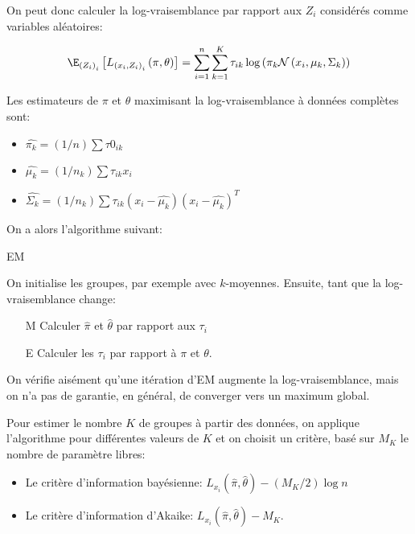 \documentclass[info, math, french]{mpb-cours}
\def\that{\hat{\theta}}
\begin{document}
On peut donc calculer la log-vraisemblance par rapport aux $Z_{i}$ considérés comme variables aléatoires:
\begin{proposition}
	\begin{equation*}
		\E_{\left(Z_{i}\right)_{i}}\left[L_{\left(x_{i}, Z_{i}\right)_{i}}\left(\pi, \theta\right)\right] = \sum_{i=1}^{n}\sum_{k = 1}^{K}\tau_{ik}\log\left(\pi_{k}\mathcal{N}\left(x_{i}, \mu_{k}, \Sigma_{k}\right)\right)
	\end{equation*}
\end{proposition}

\begin{proposition}
	Les estimateurs de $\pi$ et $\theta$ maximisant la log-vraisemblance à données complètes sont:
	\begin{itemize}
		\item $\hat{\pi_{k}} = (1/n)\sum \tau0_{ik}$
		\item $\hat{\mu_{k}} = (1/n_{k})\sum \tau_{ik}x_{i}$
		\item $\hat{\Sigma_{k}} = (1/n_{k})\sum \tau_{ik}(x_{i} - \hat{\mu_{k}})(x_{i} - \hat{\mu_{k}})^{T}$
	\end{itemize}
\end{proposition}

On a alors l'algorithme suivant:
\begin{algorithm}
	\caption{EM}
	\label{alg:em}
	On initialise les groupes, par exemple avec $k$-moyennes. Ensuite, tant que la log-vraisemblance change:
	\begin{enumerate}
		\item[M] Calculer $\hat{\pi}$ et $\that$ par rapport aux $\tau_{i}$
		\item[E] Calculer les $\tau_{i}$ par rapport à $\pi$ et $\theta$.
	\end{enumerate}
\end{algorithm}

On vérifie aisément qu'une itération d'EM augmente la log-vraisemblance, mais on n'a pas de garantie, en général, de converger vers un maximum global.

Pour estimer le nombre $K$ de groupes à partir des données, on applique l'algorithme pour différentes valeurs de $K$ et on choisit un critère, basé sur $M_{K}$ le nombre de paramètre libres:
\begin{itemize}
	\item Le critère d'information bayésienne: $L_{x_{i}}(\hat{\pi}, \that) - (M_{K} / 2)\log n$
	\item Le critère d'information d'Akaike: $L_{x_{i}}(\hat{\pi}, \that) - M_{K}$.
\end{itemize}
\end{document}
